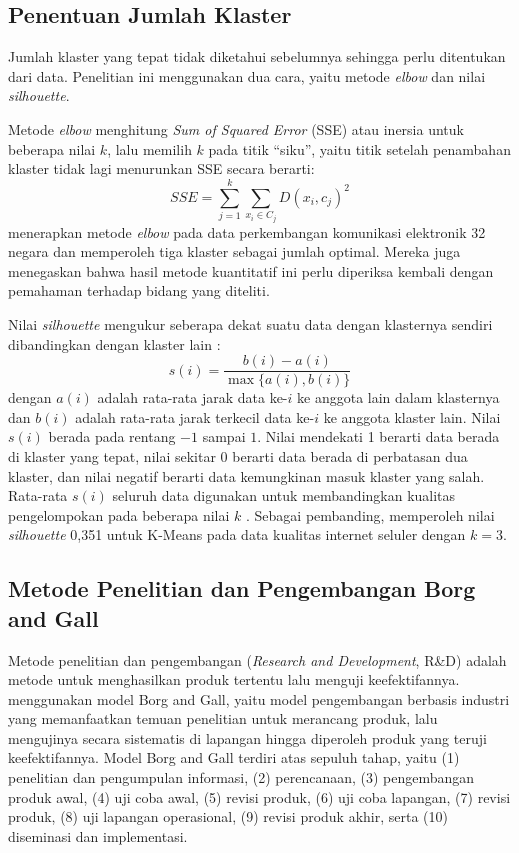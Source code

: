 \subsection{Penentuan Jumlah Klaster}
\label{subsec:jumlah_klaster}
Jumlah klaster yang tepat tidak diketahui sebelumnya sehingga perlu ditentukan dari data. Penelitian ini menggunakan dua cara, yaitu metode \textit{elbow} dan nilai \textit{silhouette}.

Metode \textit{elbow} menghitung \textit{Sum of Squared Error} (SSE) atau inersia untuk beberapa nilai $k$, lalu memilih $k$ pada titik ``siku'', yaitu titik setelah penambahan klaster tidak lagi menurunkan SSE secara berarti:
\begin{equation}
SSE = \sum_{j=1}^{k}\sum_{x_i \in C_j} D(x_i, c_j)^2
\label{eq:sse}
\end{equation}
\textcite{mihevc2025elbow} menerapkan metode \textit{elbow} pada data perkembangan komunikasi elektronik 32 negara dan memperoleh tiga klaster sebagai jumlah optimal. Mereka juga menegaskan bahwa hasil metode kuantitatif ini perlu diperiksa kembali dengan pemahaman terhadap bidang yang diteliti.

Nilai \textit{silhouette} mengukur seberapa dekat suatu data dengan klasternya sendiri dibandingkan dengan klaster lain \parencite{shahapure2020silhouette}:
\begin{equation}
s(i) = \frac{b(i) - a(i)}{\max\{a(i), b(i)\}}
\label{eq:silhouette}
\end{equation}
dengan $a(i)$ adalah rata-rata jarak data ke-$i$ ke anggota lain dalam klasternya dan $b(i)$ adalah rata-rata jarak terkecil data ke-$i$ ke anggota klaster lain. Nilai $s(i)$ berada pada rentang $-1$ sampai $1$. Nilai mendekati 1 berarti data berada di klaster yang tepat, nilai sekitar 0 berarti data berada di perbatasan dua klaster, dan nilai negatif berarti data kemungkinan masuk klaster yang salah. Rata-rata $s(i)$ seluruh data digunakan untuk membandingkan kualitas pengelompokan pada beberapa nilai $k$ \parencite{shahapure2020silhouette}. Sebagai pembanding, \textcite{irwansyah2025kmeans} memperoleh nilai \textit{silhouette} 0,351 untuk K-Means pada data kualitas internet seluler dengan $k = 3$.

\subsection{Metode Penelitian dan Pengembangan Borg and Gall}
Metode penelitian dan pengembangan (\textit{Research and Development}, R\&D) adalah metode untuk menghasilkan produk tertentu lalu menguji keefektifannya. \textcite{jamaludin2024borggall} menggunakan model Borg and Gall, yaitu model pengembangan berbasis industri yang memanfaatkan temuan penelitian untuk merancang produk, lalu mengujinya secara sistematis di lapangan hingga diperoleh produk yang teruji keefektifannya. Model Borg and Gall terdiri atas sepuluh tahap, yaitu (1) penelitian dan pengumpulan informasi, (2) perencanaan, (3) pengembangan produk awal, (4) uji coba awal, (5) revisi produk, (6) uji coba lapangan, (7) revisi produk, (8) uji lapangan operasional, (9) revisi produk akhir, serta (10) diseminasi dan implementasi.

